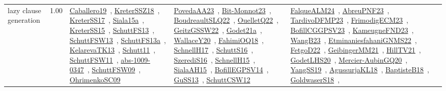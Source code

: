 {\begin{longtable}{p{3cm}r>{\raggedright\arraybackslash}p{6cm}>{\raggedright\arraybackslash}p{6cm}>{\raggedright\arraybackslash}p{8cm}}
\index{lazy clause generation}\index{Algorithms!lazy clause generation}lazy clause generation &  1.00 & \href{../works/Caballero19.pdf}{Caballero19}~\cite{Caballero19}, \href{../works/KreterSSZ18.pdf}{KreterSSZ18}~\cite{KreterSSZ18}, \href{../works/KreterSS17.pdf}{KreterSS17}~\cite{KreterSS17}, \href{../works/Siala15a.pdf}{Siala15a}~\cite{Siala15a}, \href{../works/KreterSS15.pdf}{KreterSS15}~\cite{KreterSS15}, \href{../works/SchuttFS13.pdf}{SchuttFS13}~\cite{SchuttFS13}, \href{../works/SchuttFSW13.pdf}{SchuttFSW13}~\cite{SchuttFSW13}, \href{../works/SchuttFS13a.pdf}{SchuttFS13a}~\cite{SchuttFS13a}, \href{../works/KelarevaTK13.pdf}{KelarevaTK13}~\cite{KelarevaTK13}, \href{../works/Schutt11.pdf}{Schutt11}~\cite{Schutt11}, \href{../works/SchuttFSW11.pdf}{SchuttFSW11}~\cite{SchuttFSW11}, \href{../works/abs-1009-0347.pdf}{abs-1009-0347}~\cite{abs-1009-0347}, \href{../works/SchuttFSW09.pdf}{SchuttFSW09}~\cite{SchuttFSW09}, \href{../works/OhrimenkoSC09.pdf}{OhrimenkoSC09}~\cite{OhrimenkoSC09} & \href{../works/PovedaAA23.pdf}{PovedaAA23}~\cite{PovedaAA23}, \href{../works/Bit-Monnot23.pdf}{Bit-Monnot23}~\cite{Bit-Monnot23}, \href{../works/BoudreaultSLQ22.pdf}{BoudreaultSLQ22}~\cite{BoudreaultSLQ22}, \href{../works/OuelletQ22.pdf}{OuelletQ22}~\cite{OuelletQ22}, \href{../works/GeitzGSSW22.pdf}{GeitzGSSW22}~\cite{GeitzGSSW22}, \href{../works/Godet21a.pdf}{Godet21a}~\cite{Godet21a}, \href{../works/WallaceY20.pdf}{WallaceY20}~\cite{WallaceY20}, \href{../works/FahimiOQ18.pdf}{FahimiOQ18}~\cite{FahimiOQ18}, \href{../works/SchnellH17.pdf}{SchnellH17}~\cite{SchnellH17}, \href{../works/SchuttS16.pdf}{SchuttS16}~\cite{SchuttS16}, \href{../works/SzerediS16.pdf}{SzerediS16}~\cite{SzerediS16}, \href{../works/SchnellH15.pdf}{SchnellH15}~\cite{SchnellH15}, \href{../works/SialaAH15.pdf}{SialaAH15}~\cite{SialaAH15}, \href{../works/BofillEGPSV14.pdf}{BofillEGPSV14}~\cite{BofillEGPSV14}, \href{../works/GuSS13.pdf}{GuSS13}~\cite{GuSS13}, \href{../works/SchuttCSW12.pdf}{SchuttCSW12}~\cite{SchuttCSW12} & \href{../works/FalqueALM24.pdf}{FalqueALM24}~\cite{FalqueALM24}, \href{../works/AbreuPNF23.pdf}{AbreuPNF23}~\cite{AbreuPNF23}, \href{../works/TardivoDFMP23.pdf}{TardivoDFMP23}~\cite{TardivoDFMP23}, \href{../works/FrimodigECM23.pdf}{FrimodigECM23}~\cite{FrimodigECM23}, \href{../works/BofillCGGPSV23.pdf}{BofillCGGPSV23}~\cite{BofillCGGPSV23}, \href{../works/KameugneFND23.pdf}{KameugneFND23}~\cite{KameugneFND23}, \href{../works/WangB23.pdf}{WangB23}~\cite{WangB23}, \href{../works/EtminaniesfahaniGNMS22.pdf}{EtminaniesfahaniGNMS22}~\cite{EtminaniesfahaniGNMS22}, \href{../works/FetgoD22.pdf}{FetgoD22}~\cite{FetgoD22}, \href{../works/GeibingerMM21.pdf}{GeibingerMM21}~\cite{GeibingerMM21}, \href{../works/HillTV21.pdf}{HillTV21}~\cite{HillTV21}, \href{../works/GodetLHS20.pdf}{GodetLHS20}~\cite{GodetLHS20}, \href{../works/Mercier-AubinGQ20.pdf}{Mercier-AubinGQ20}~\cite{Mercier-AubinGQ20}, \href{../works/YangSS19.pdf}{YangSS19}~\cite{YangSS19}, \href{../works/AgussurjaKL18.pdf}{AgussurjaKL18}~\cite{AgussurjaKL18}, \href{../works/BaptisteB18.pdf}{BaptisteB18}~\cite{BaptisteB18}, \href{../works/GoldwaserS18.pdf}{GoldwaserS18}~\cite{GoldwaserS18}, 
\end{longtable}}
